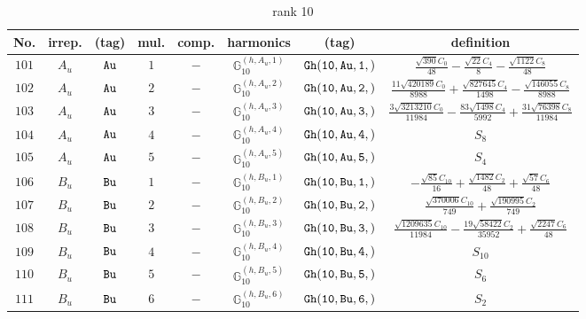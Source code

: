 \documentclass[fleqn,8pt]{jsarticle}
\begin{document}
\begin{table}[ht!]
\begin{center}
\caption{rank 10}
\renewcommand{\arraystretch}{1.3}
\begin{tabular}{cccccccc} \hline \hline
No. & irrep. & (tag) & mul. & comp. & harmonics & (tag) & definition \\ \hline
$ 101 $ & $ A_{u} $ & $ {\tt Au} $ & $ 1 $ & $ - $ & $ \mathbb{G}_{10}^{(h,A_{u},1)} $ & $ {\tt Gh(10,Au,1,)} $ & $ \frac{\sqrt{390} C_{0}}{48} - \frac{\sqrt{22} C_{4}}{8} - \frac{\sqrt{1122} C_{8}}{48} $ \\
$ 102 $ & $ A_{u} $ & $ {\tt Au} $ & $ 2 $ & $ - $ & $ \mathbb{G}_{10}^{(h,A_{u},2)} $ & $ {\tt Gh(10,Au,2,)} $ & $ \frac{11 \sqrt{420189} C_{0}}{8988} + \frac{\sqrt{827645} C_{4}}{1498} - \frac{\sqrt{146055} C_{8}}{8988} $ \\
$ 103 $ & $ A_{u} $ & $ {\tt Au} $ & $ 3 $ & $ - $ & $ \mathbb{G}_{10}^{(h,A_{u},3)} $ & $ {\tt Gh(10,Au,3,)} $ & $ \frac{3 \sqrt{3213210} C_{0}}{11984} - \frac{83 \sqrt{1498} C_{4}}{5992} + \frac{31 \sqrt{76398} C_{8}}{11984} $ \\
$ 104 $ & $ A_{u} $ & $ {\tt Au} $ & $ 4 $ & $ - $ & $ \mathbb{G}_{10}^{(h,A_{u},4)} $ & $ {\tt Gh(10,Au,4,)} $ & $ S_{8} $ \\
$ 105 $ & $ A_{u} $ & $ {\tt Au} $ & $ 5 $ & $ - $ & $ \mathbb{G}_{10}^{(h,A_{u},5)} $ & $ {\tt Gh(10,Au,5,)} $ & $ S_{4} $ \\
$ 106 $ & $ B_{u} $ & $ {\tt Bu} $ & $ 1 $ & $ - $ & $ \mathbb{G}_{10}^{(h,B_{u},1)} $ & $ {\tt Gh(10,Bu,1,)} $ & $ - \frac{\sqrt{85} C_{10}}{16} + \frac{\sqrt{1482} C_{2}}{48} + \frac{\sqrt{57} C_{6}}{48} $ \\
$ 107 $ & $ B_{u} $ & $ {\tt Bu} $ & $ 2 $ & $ - $ & $ \mathbb{G}_{10}^{(h,B_{u},2)} $ & $ {\tt Gh(10,Bu,2,)} $ & $ \frac{\sqrt{370006} C_{10}}{749} + \frac{\sqrt{190995} C_{2}}{749} $ \\
$ 108 $ & $ B_{u} $ & $ {\tt Bu} $ & $ 3 $ & $ - $ & $ \mathbb{G}_{10}^{(h,B_{u},3)} $ & $ {\tt Gh(10,Bu,3,)} $ & $ \frac{\sqrt{1209635} C_{10}}{11984} - \frac{19 \sqrt{58422} C_{2}}{35952} + \frac{\sqrt{2247} C_{6}}{48} $ \\
$ 109 $ & $ B_{u} $ & $ {\tt Bu} $ & $ 4 $ & $ - $ & $ \mathbb{G}_{10}^{(h,B_{u},4)} $ & $ {\tt Gh(10,Bu,4,)} $ & $ S_{10} $ \\
$ 110 $ & $ B_{u} $ & $ {\tt Bu} $ & $ 5 $ & $ - $ & $ \mathbb{G}_{10}^{(h,B_{u},5)} $ & $ {\tt Gh(10,Bu,5,)} $ & $ S_{6} $ \\
$ 111 $ & $ B_{u} $ & $ {\tt Bu} $ & $ 6 $ & $ - $ & $ \mathbb{G}_{10}^{(h,B_{u},6)} $ & $ {\tt Gh(10,Bu,6,)} $ & $ S_{2} $ \\

\end{tabular}
\end{center}
\end{table}
\end{document}
